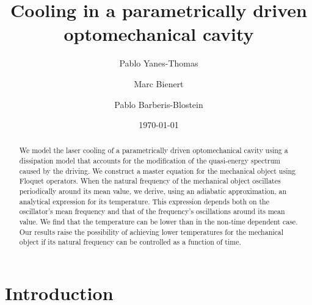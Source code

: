 \documentclass[reprint, amsmath,amssymb, aps,pra]{revtex4-1}
\begin{document}

\title{Cooling in a parametrically driven optomechanical cavity}%

\author{Pablo Yanes-Thomas}

\author{Marc Bienert}

\author{Pablo Barberis-Blostein}

%



\date{\today}

\begin{abstract}
  We model the laser cooling of a parametrically driven optomechanical
  cavity using a dissipation model 
  that accounts for the modification of the quasi-energy spectrum
  caused by the driving. We construct a master equation for the
  mechanical object using Floquet operators. When the natural
  frequency of the mechanical object oscillates periodically around its mean value,
  we derive, using an adiabatic approximation, an analytical
  expression for its temperature. This expression depends both on the
  oscillator's mean frequency and that of the frequency's oscillations
  around its mean value. We find that the temperature can be lower
  than in the non-time dependent case. Our results raise the
  possibility of achieving lower temperatures for the mechanical object
  if its natural frequency can be controlled as a function of time.
\end{abstract}

\maketitle


\section{Introduction}
\end{document}
